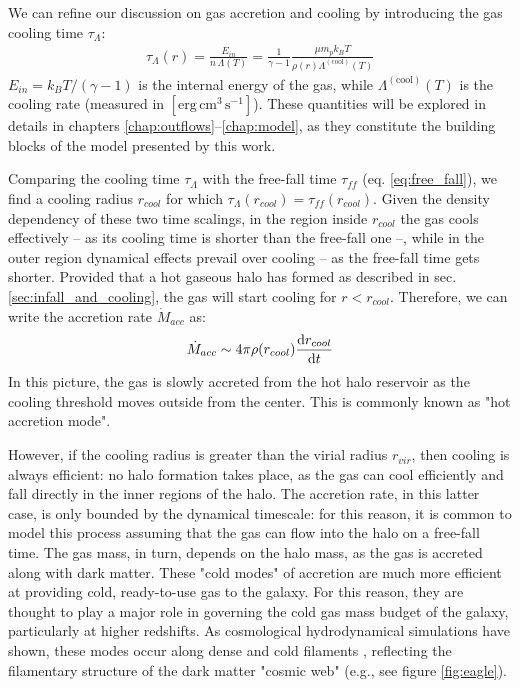   We can refine our discussion on gas accretion and cooling by introducing the gas cooling time $\tau_\Lambda$:
  \begin{align}
   \tau_\Lambda(r) = \frac{E_{in}}{n\,\Lambda(T)} = \frac{1}{\gamma - 1}\frac{\mu m_p k_B T}{\rho(r)\Lambda^\mathrm{(cool)}(T)} \label{eq:tcool}
  \end{align}
  $E_{in}= k_B T/(\gamma-1)$ is the internal energy of the gas, while $\Lambda^\mathrm{(cool)}(T)$ is the cooling rate (measured in $[\mathrm{erg}\,\mathrm{cm}^3\,\mathrm{s}^{-1}]$). These quantities will be explored in details in chapters \ref{chap:outflows}--\ref{chap:model}, as they constitute the building blocks of the model presented by this work. 
  
  Comparing the cooling time $\tau_\Lambda$ with the free-fall time $\tau_{ff}$ (eq. \ref{eq:free_fall}), we find a cooling radius $r_{cool}$ for which $\tau_\Lambda(r_{cool})=\tau_{ff}(r_{cool})$. Given the density dependency of these two time scalings, in the region inside $r_{cool}$ the gas cools effectively -- as its cooling time is shorter than the free-fall one --, while in the outer region dynamical effects prevail over cooling -- as the free-fall time gets shorter. Provided that a hot gaseous halo has formed as described in sec. \ref{sec:infall_and_cooling}, the gas will start cooling for $r<r_{cool}$. Therefore, we can write the accretion rate $\Dot{M}_{acc}$ as:
  \begin{align}
   \dot{M}_{acc} \sim 4\pi \rho(r_{cool})\frac{\mathrm{d} r_{cool}}{\mathrm{d} t}
  \end{align}
  In this picture, the gas is slowly accreted from the hot halo reservoir as the cooling threshold moves outside from the center. This is commonly known as "hot accretion mode".
  
  However, if the cooling radius is greater than the virial radius $r_{vir}$, then cooling is always efficient: no halo formation takes place, as the gas can cool efficiently and fall directly in the inner regions of the halo. The accretion rate, in this latter case, is only bounded by the dynamical timescale: for this reason, it is common to model this process assuming that the gas can flow into the halo on a free-fall time. The gas mass, in turn, depends on the halo mass, as the gas is accreted along with dark matter. These "cold modes" of accretion are much more efficient at providing cold, ready-to-use gas to the galaxy. For this reason, they are thought to play a major role in governing the cold gas mass budget of the galaxy, particularly at higher redshifts. As cosmological hydrodynamical simulations have shown, these modes occur along dense and cold filaments \citep{kerevs2005galaxies}, reflecting the filamentary structure of the dark matter "cosmic web" (e.g., see figure \ref{fig:eagle}). 

